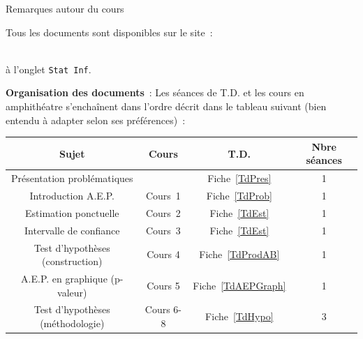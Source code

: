 \documentclass[10pt]{report}
\begin{document}
\begin{IndicList}{Remarques autour du cours}
{Tous les documents sont disponibles sur le site~:\\
\centerline{}\\
à l'onglet \texttt{Stat Inf}.} 
\item {\small \textbf{Organisation des documents}~: Les séances de T.D. et les cours en amphithéatre s'enchaînent dans l'ordre décrit dans le tableau suivant (bien entendu à adapter selon ses préférences)~:\\
\begin{center}\begin{tabular}{|c|c|c|c|}\hline
Sujet & Cours & T.D. & Nbre séances\\\hline
Présentation problématiques &  & Fiche~\ref{TdPres} & 1 \\\hline
Introduction A.E.P. & Cours~1 & Fiche~\ref{TdProb} & 1 \\\hline
Estimation ponctuelle & Cours~2 & Fiche~\ref{TdEst} & 1 \\\hline
Intervalle de confiance & Cours~3 & Fiche~\ref{TdEst} & 1\\\hline
Test d'hypothèses (construction) & Cours 4 & Fiche~\ref{TdProdAB} & 1 \\\hline
A.E.P. en graphique (p-valeur)  & Cours 5 & Fiche~\ref{TdAEPGraph} & 1 \\\hline 
Test d'hypothèses (méthodologie) & Cours 6-8 &  Fiche~\ref{TdHypo} & 3 \\\hline
\end{tabular}\end{center}}
\end{IndicList}
\end{document}
